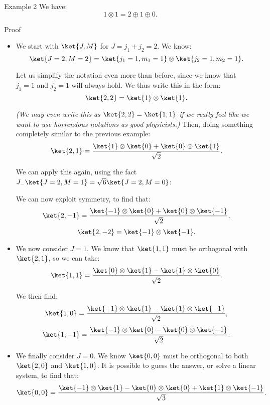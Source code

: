 \documentclass[a4paper]{article}
\begin{document}
\begin{parag}{Example 2}
    We have:
    \[1 \otimes 1 = 2 \oplus 1 \oplus 0.\]

    \begin{subparag}{Proof}
        \begin{itemize}
            \item We start with $\ket{J, M}$ for $J = j_1 + j_2 = 2$. We know: 
            \[\ket{J = 2, M = 2} = \ket{j_1 = 1, m_1 = 1} \otimes \ket{j_2 = 1, m_2 = 1}.\]

            Let us simplify the notation even more than before, since we know that $j_1 = 1$ and $j_2 = 1$ will always hold. We thus write this in the form: 
            \[\ket{2, 2} = \ket{1} \otimes \ket{1}.\]

            \textit{(We may even write this as $\ket{2, 2} = \ket{1, 1}$ if we really feel like we want to use horrendous notations as good physicists.)} Then, doing something completely similar to the previous example: 
            \[\ket{2, 1} = \frac{\ket{1} \otimes \ket{0} + \ket{0} \otimes \ket{1}}{\sqrt{2}}.\]
            
            We can apply this again, using the fact $J_- \ket{J=2, M=1} = \sqrt{6}\ket{J=2, M=0}$: 
            
            We can now exploit symmetry, to find that: 
            \[\ket{2, -1} = \frac{\ket{-1} \otimes \ket{0} + \ket{0} \otimes \ket{-1}}{\sqrt{2}},\]
            \[\ket{2, -2} = \ket{-1} \otimes \ket{-1}.\]
             
            \item We now consider $J = 1$.  We know that $\ket{1, 1}$ must be orthogonal with $\ket{2,1}$, so we can take: 
            \[\ket{1, 1} = \frac{\ket{0} \otimes \ket{1} - \ket{1} \otimes \ket{0}}{\sqrt{2}}.\]

            We then find: 
            \[\ket{1, 0} = \frac{\ket{-1} \otimes \ket{1} - \ket{1} \otimes \ket{-1}}{\sqrt{2}},\]
            \[\ket{1, -1} = \frac{\ket{-1} \otimes \ket{0} - \ket{0} \otimes \ket{-1}}{\sqrt{2}}.\]
            
            \item We finally consider $J = 0$. We know $\ket{0, 0}$ must be orthogonal to both $\ket{2, 0}$ and $\ket{1, 0}$. It is possible to guess the answer, or solve a linear system, to find that: 
            \[\ket{0, 0} = \frac{\ket{-1} \otimes \ket{1} - \ket{0} \otimes \ket{0} + \ket{1} \otimes \ket{-1}}{\sqrt{3}}.\]
        \end{itemize}
    \end{subparag}
\end{parag}
\end{document}
